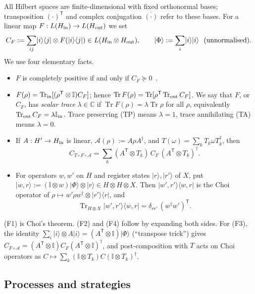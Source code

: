 \documentclass[aps,pra,onecolumn,notitlepage,superscriptaddress,longbibliography,nofootinbib,11pt]{revtex4-2}
\theoremstyle{remark}
\newcommand{\Tr}{\operatorname{Tr}}
\newcommand{\ket}[1]{\lvert #1\rangle}
\newcommand{\bra}[1]{\langle #1\rvert}
\newcommand{\one}{\mathbb{I}}
\newcommand{\tp}{\mathsf{T}}
\newcommand{\CC}{\mathbb{C}}
\begin{document}
All Hilbert spaces are finite-dimensional with fixed orthonormal bases; transposition $(\cdot)^\tp$ and complex conjugation $\overline{(\cdot)}$ refer to these bases. For a linear map $F:L(H_{\rm in})\to L(H_{\rm out})$ we set
\begin{equation}
C_F:=\sum_{ij}\ket{i}\bra{j}\otimes F(\ket{i}\bra{j})\in L(H_{\rm in}\otimes H_{\rm out}),\qquad
\ket{\Phi}:=\sum_i\ket{i}\ket{i}\ \ \text{(unnormalised)}.
\end{equation}
We use four elementary facts.
\begin{itemize}
\item[(F1)] $F$ is completely positive if and only if $C_F\succeq0$~\cite{Choi1975}.
\item[(F2)] $F(\rho)=\Tr_{\rm in}[(\rho^\tp\otimes\one)C_F]$; hence $\Tr F(\rho)=\Tr[\rho^\tp\Tr_{\rm out}C_F]$. We say that $F$, or $C_F$, has \emph{scalar trace} $\lambda\in\CC$ if $\Tr F(\rho)=\lambda\Tr\rho$ for all $\rho$, equivalently $\Tr_{\rm out}C_F=\lambda\one_{\rm in}$. Trace preserving (TP) means $\lambda=1$, trace annihilating (TA) means $\lambda=0$.
\item[(F3)] If $A:H'\to H_{\rm in}$ is linear, $\mathcal A(\rho):=A\rho A^\dagger$, and $T(\omega)=\sum_kT_k\omega T_k^\dagger$, then
\begin{equation}
C_{T\circ F\circ\mathcal A}=\sum_k(A^\tp\otimes T_k)\,C_F\,(A^\tp\otimes T_k)^\dagger .
\label{eq:F3}
\end{equation}
\item[(F4)] For operators $w,w'$ on $H$ and register states $\ket{r},\ket{r'}$ of $X$, put $\ket{w,r}:=(\one\otimes w)\ket{\Phi}\otimes\ket{r}\in H\otimes H\otimes X$. Then $\ket{w',r'}\bra{w,r}$ is the Choi operator of $\rho\mapsto w'\rho w^\dagger\otimes\ket{r'}\bra{r}$, and
\begin{equation}
\Tr_{H\otimes X}\ket{w',r'}\bra{w,r}=\delta_{rr'}\,(w^\dagger w')^\tp .
\label{eq:F4}
\end{equation}
\end{itemize}
(F1) is Choi's theorem. (F2) and (F4) follow by expanding both sides. For (F3), the identity $\sum_i\ket{i}\otimes A\ket{i}=(A^\tp\otimes\one)\ket{\Phi}$ (``transpose trick'') gives $C_{F\circ\mathcal A}=(A^\tp\otimes\one)C_F(A^\tp\otimes\one)^\dagger$, and post-composition with $T$ acts on Choi operators as $C\mapsto\sum_k(\one\otimes T_k)C(\one\otimes T_k)^\dagger$.

\subsection{Processes and strategies}
\end{document}
